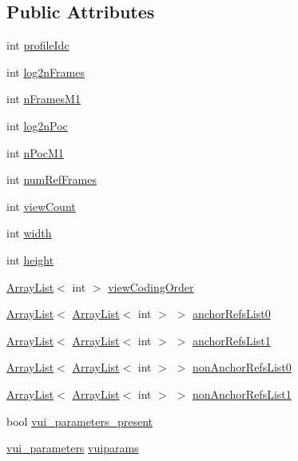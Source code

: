 \begin{figure}[H]
\begin{center}
\end{center}
\end{figure}
\subsection*{Public Attributes}
\begin{DoxyCompactItemize}
\item 
int \hyperlink{struct_sequence_parameters_set_a53070cb0140d170507760e8422f2ef74}{profileIdc}
\item 
int \hyperlink{struct_sequence_parameters_set_ac5f0d82a961acfe4f966e7c35aa37339}{log2nFrames}
\item 
int \hyperlink{struct_sequence_parameters_set_afedac9d01de6ec718715ab45c63ee999}{nFramesM1}
\item 
int \hyperlink{struct_sequence_parameters_set_aff653fc637f7290b7edbaf1cfeacd6ca}{log2nPoc}
\item 
int \hyperlink{struct_sequence_parameters_set_a786d1401a47490d15c7f1512e21994ce}{nPocM1}
\item 
int \hyperlink{struct_sequence_parameters_set_a8404973d25f8601dd012299638361f03}{numRefFrames}
\item 
int \hyperlink{struct_sequence_parameters_set_af32c7819f630856ccd99aaf78e8f656c}{viewCount}
\item 
int \hyperlink{struct_sequence_parameters_set_a72286e512a40a01670e2519b3971cee2}{width}
\item 
int \hyperlink{struct_sequence_parameters_set_ab3b7bd818f9a0d1456d92496473a42eb}{height}
\item 
\hyperlink{class_array_list}{ArrayList}$<$ int $>$ \hyperlink{struct_sequence_parameters_set_a082e13208bc0afd9377676e156e750b4}{viewCodingOrder}
\item 
\hyperlink{class_array_list}{ArrayList}$<$ \hyperlink{class_array_list}{ArrayList}$<$ int $>$ $>$ \hyperlink{struct_sequence_parameters_set_ae9b6a7d85da9fec255cca59c3d750ecd}{anchorRefsList0}
\item 
\hyperlink{class_array_list}{ArrayList}$<$ \hyperlink{class_array_list}{ArrayList}$<$ int $>$ $>$ \hyperlink{struct_sequence_parameters_set_a7b865f89c34428785081c3c4acadc965}{anchorRefsList1}
\item 
\hyperlink{class_array_list}{ArrayList}$<$ \hyperlink{class_array_list}{ArrayList}$<$ int $>$ $>$ \hyperlink{struct_sequence_parameters_set_ab9b078b23e746ef60f7697896b963b93}{nonAnchorRefsList0}
\item 
\hyperlink{class_array_list}{ArrayList}$<$ \hyperlink{class_array_list}{ArrayList}$<$ int $>$ $>$ \hyperlink{struct_sequence_parameters_set_a68b7ffb23b151c53312798f7ab79a67a}{nonAnchorRefsList1}
\item 
bool \hyperlink{struct_sequence_parameters_set_a557345c281f445eb71cbcd5d72a9aed0}{vui\_\-parameters\_\-present}
\item 
\hyperlink{structvui__parameters}{vui\_\-parameters} \hyperlink{struct_sequence_parameters_set_ac473de5b97f08fefdbe39fe9c2c2c846}{vuiparams}
\end{DoxyCompactItemize}


